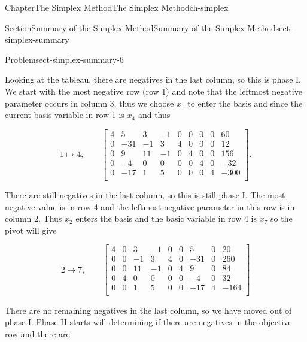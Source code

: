 \documentclass[oneside,10pt,]{book}
\numberwithin{equation}{section}
\newcommand{\amp}{&}
\begin{document}
\begin{chapterptx}{Chapter}{The Simplex Method}{}{The Simplex Method}{}{}{ch-simplex}
\begin{sectionptx}{Section}{Summary of the Simplex Method}{}{Summary of the Simplex Method}{}{}{sect-simplex-summary}
\begin{problem}{Problem}{}{sect-simplex-summary-6}
\begin{equation*}
\end{equation*}
%
\par
Looking at the tableau, there are negatives in the last column, so this is phase I. We start with the most negative row (row 1) and note that the leftmost negative parameter occurs in column 3, thus we choose \(x_1\) to enter the basis and since the current basis variable in row 1 is \(x_4\) and thus%
\par
%
\begin{equation*}
1 \mapsto 4, \qquad \left[\begin{array}{rrr|rrrrr|r} 4 \amp 5 \amp 3 \amp -1 \amp 0 \amp 0 \amp 0 \amp 0 \amp 60\\ 0 \amp -31 \amp -1 \amp 3 \amp 4 \amp 0 \amp 0 \amp 0 \amp 12\\ 0 \amp 9 \amp 11 \amp -1 \amp 0 \amp 4 \amp 0 \amp 0 \amp 156\\ 0 \amp -4 \amp 0 \amp 0 \amp 0 \amp 0 \amp 4 \amp 0 \amp -32\\ \hline 0 \amp -17 \amp 1 \amp 5 \amp 0 \amp 0 \amp 0 \amp 4 \amp -300\\ \end{array} \right] .
\end{equation*}
%
\par
There are still negatives in the last column, so this is still phase I. The most negative value is in row 4 and the leftmost negative parameter in this row is in column 2. Thus \(x_2\) enters the basis and the basic variable in row 4 is \(x_7\) so the pivot will give%
\par
%
\begin{equation*}
2 \mapsto 7, \qquad \left[\begin{array}{rrr|rrrrr|r} 4 \amp 0 \amp 3 \amp -1 \amp 0 \amp 0 \amp 5 \amp 0 \amp 20\\ 0 \amp 0 \amp -1 \amp 3 \amp 4 \amp 0 \amp -31 \amp 0 \amp 260\\ 0 \amp 0 \amp 11 \amp -1 \amp 0 \amp 4 \amp 9 \amp 0 \amp 84\\ 0 \amp 4 \amp 0 \amp 0 \amp 0 \amp 0 \amp -4 \amp 0 \amp 32\\ \hline 0 \amp 0 \amp 1 \amp 5 \amp 0 \amp 0 \amp -17 \amp 4 \amp -164\\ \end{array} \right]
\end{equation*}
%
\par
There are no remaining negatives in the last column, so we have moved out of phase I. Phase II starts will determining if there are negatives in the objective row and there are.%

\end{problem}
\end{sectionptx}
\end{chapterptx}
\end{document}

